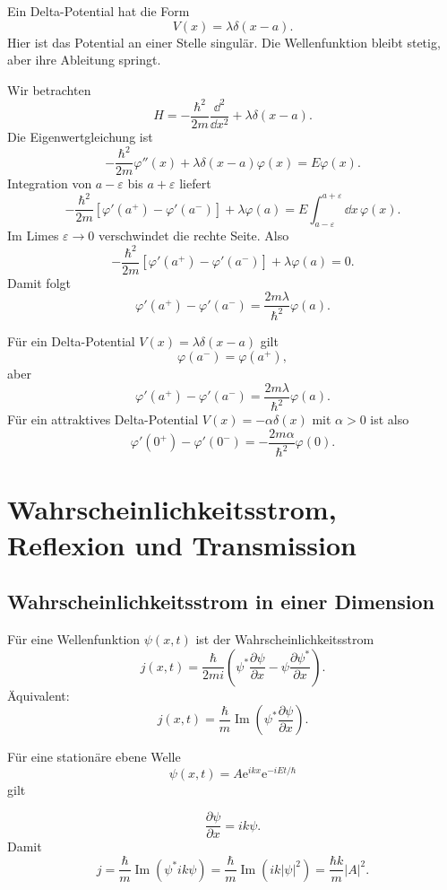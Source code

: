 Ein Delta-Potential hat die Form
\[
    V(x)=\lambda\delta(x-a).
\]
Hier ist das Potential an einer Stelle singulär. Die Wellenfunktion bleibt stetig, aber ihre Ableitung springt.

\begin{derivationbox}
Wir betrachten
\[
    H=-\frac{\hbar^2}{2m}\frac{\dd^2}{\dd x^2}+\lambda\delta(x-a).
\]
Die Eigenwertgleichung ist
\[
    -\frac{\hbar^2}{2m}\varphi''(x)+\lambda\delta(x-a)\varphi(x)=E\varphi(x).
\]
Integration von $a-\varepsilon$ bis $a+\varepsilon$ liefert
\[
    -\frac{\hbar^2}{2m}\left[\varphi'(a^+)-\varphi'(a^-)\right]
    +\lambda\varphi(a)
    =E\int_{a-\varepsilon}^{a+\varepsilon}\dd x\,\varphi(x).
\]
Im Limes $\varepsilon\to0$ verschwindet die rechte Seite. Also
\[
    -\frac{\hbar^2}{2m}\left[\varphi'(a^+)-\varphi'(a^-)\right]
    +\lambda\varphi(a)=0.
\]
Damit folgt
\[
    \varphi'(a^+)-\varphi'(a^-)
    =\frac{2m\lambda}{\hbar^2}\varphi(a).
\]
\end{derivationbox}

\begin{formulabox}
Für ein Delta-Potential $V(x)=\lambda\delta(x-a)$ gilt
\[
    \boxed{\varphi(a^-)=\varphi(a^+)},
\]
aber
\[
    \boxed{\varphi'(a^+)-\varphi'(a^-)=\frac{2m\lambda}{\hbar^2}\varphi(a)}.
\]
Für ein attraktives Delta-Potential $V(x)=-\alpha\delta(x)$ mit $\alpha>0$ ist also
\[
    \varphi'(0^+)-\varphi'(0^-)
    =-\frac{2m\alpha}{\hbar^2}\varphi(0).
\]
\end{formulabox}

\section{Wahrscheinlichkeitsstrom, Reflexion und Transmission}

\subsection{Wahrscheinlichkeitsstrom in einer Dimension}

Für eine Wellenfunktion $\psi(x,t)$ ist der Wahrscheinlichkeitsstrom
\[
    j(x,t)=\frac{\hbar}{2mi}\left(\psi^*\frac{\partial\psi}{\partial x}-\psi\frac{\partial\psi^*}{\partial x}\right).
\]
Äquivalent:
\[
    j(x,t)=\frac{\hbar}{m}\operatorname{Im}\left(\psi^*\frac{\partial\psi}{\partial x}\right).
\]

Für eine stationäre ebene Welle
\[
    \psi(x,t)=A\mathrm{e}^{ikx}\mathrm{e}^{-iEt/\hbar}
\]
gilt
\begin{derivationbox}
\[
    \frac{\partial\psi}{\partial x}=ik\psi.
\]
Damit
\[
    j=\frac{\hbar}{m}\operatorname{Im}(\psi^*ik\psi)
    =\frac{\hbar}{m}\operatorname{Im}(ik|\psi|^2)
    =\frac{\hbar k}{m}|A|^2.
\]
\end{derivationbox}


